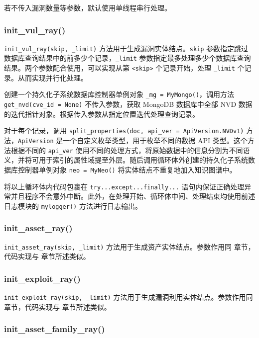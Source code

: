 \documentclass[a4paper,AutoFakeBold,oneside,12pt]{book}
\begin{document}
若不传入漏洞数量等参数，默认使用单线程串行处理。

\subsubsection{init{\_}vul{\_}ray()\label{subsubsec:vul}}

\lstinline|init_vul_ray(skip, _limit)| 方法用于生成漏洞实体结点。\lstinline|skip| 参数指定跳过数据库查询结果中的前多少个记录，\lstinline|_limit| 参数指定最多处理多少个数据库查询结果。两个参数配合使用，可以实现从第 \lstinline|<skip>| 个记录开始，处理 \lstinline|_limit| 个记录。从而实现并行化处理。

创建一个持久化子系统数据库控制器单例对象 \lstinline|_mg = MyMongo()|，调用方法 \lstinline|get_nvd(cve_id = None)| 不传入参数，获取 MongoDB 数据库中全部 NVD 数据的迭代指针对象。根据传入参数从指定位置迭代处理查询记录。

对于每个记录，调用 \lstinline|split_properties(doc, api_ver = ApiVersion.NVDv1)| 方法，\lstinline|ApiVersion| 是一个自定义枚举类型，用于枚举不同的数据 API 类型。这个方法根据不同的 \lstinline|api_ver| 使用不同的处理方式，将原始数据中的信息分割为不同语义，并将可用于索引的属性域提至外层。随后调用循环体外创建的持久化子系统数据库控制器单例对象 \lstinline|neo = MyNeo()| 将实体结点不重复地加入知识图谱中。

将以上循环体内代码包裹在 \lstinline|try...except...finally...| 语句内保证正确处理异常并且程序不会意外中断。此外，在处理开始、循环体中间、处理结束均使用前述日志模块的 \lstinline|mylogger()| 方法进行日志输出。

\subsubsection{init{\_}asset{\_}ray()}

\lstinline|init_asset_ray(skip, _limit)| 方法用于生成资产实体结点。参数作用同  章节，代码实现与  章节所述类似。

\subsubsection{init{\_}exploit{\_}ray()}

\lstinline|init_exploit_ray(skip, _limit)| 方法用于生成漏洞利用实体结点。参数作用同  章节，代码实现与  章节所述类似。

\subsubsection{init{\_}asset{\_}family{\_}ray()}
\end{document}

